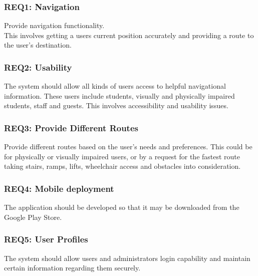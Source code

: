 \documentclass{article}
\begin{document}
		\subsubsection {REQ1: Navigation}
			Provide navigation functionality.\\ This involves getting a users current position accurately and providing a route to the user's destination.
			
		\subsubsection{REQ2: Usability}
			The system should allow all kinds of users access to helpful navigational information. These users include students, visually and physically impaired students, staff and guests. This involves accessibility and usability issues.
			
		\subsubsection{REQ3: Provide Different Routes}
			Provide different routes based on the user's needs and preferences. This could be for physically or visually impaired users, or by a request for the fastest route taking stairs, ramps, lifts, wheelchair access and obstacles into consideration. %
			
		\subsubsection{REQ4: Mobile deployment}
			The application should be developed so that it may be downloaded from the Google Play Store. %
		
		\subsubsection{REQ5: User Profiles}
			The system should allow users and administrators login capability and maintain certain information regarding them securely. %
			
\end{document}
